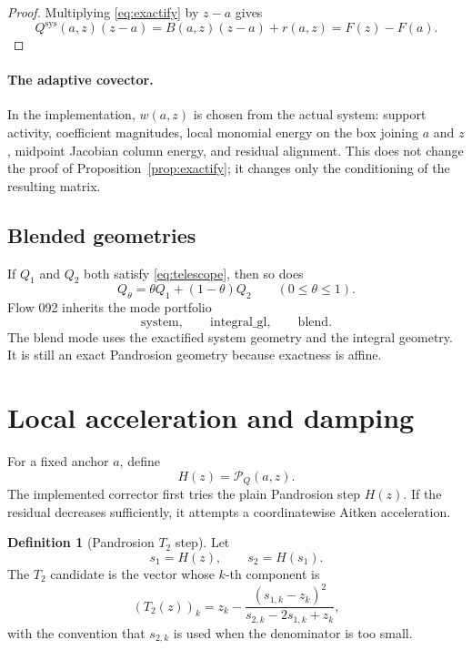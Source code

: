 \documentclass[11pt,a4paper]{article}
\theoremstyle{definition}
\newtheorem{definition}{Definition}[section]
\theoremstyle{plain}
\theoremstyle{remark}
\begin{document}
\begin{proof}
Multiplying \eqref{eq:exactify} by \(z-a\) gives
\[
  Q^{\mathrm{sys}}(a,z)(z-a)
  =
  B(a,z)(z-a)
  +
  r(a,z)
  =
  F(z)-F(a).
\]
\end{proof}

\paragraph{The adaptive covector.}
In the implementation, \(w(a,z)\) is chosen from the actual system:
support activity, coefficient magnitudes, local monomial energy on the box
joining \(a\) and \(z\), midpoint Jacobian column energy, and residual
alignment.  This does not change the proof of Proposition~\ref{prop:exactify};
it changes only the conditioning of the resulting matrix.

\subsection{Blended geometries}

If \(Q_1\) and \(Q_2\) both satisfy \eqref{eq:telescope}, then so does
\[
  Q_\theta=\theta Q_1+(1-\theta)Q_2
  \qquad(0\le \theta\le1).
\]
Flow 092 inherits the mode portfolio
\[
  \mathrm{system},\qquad \mathrm{integral\_gl},\qquad \mathrm{blend}.
\]
The blend mode uses the exactified system geometry and the integral geometry.
It is still an exact Pandrosion geometry because exactness is affine.

\section{Local acceleration and damping}

For a fixed anchor \(a\), define
\[
  H(z)=\mathcal P_Q(a,z).
\]
The implemented corrector first tries the plain Pandrosion step \(H(z)\).  If
the residual decreases sufficiently, it attempts a coordinatewise Aitken
acceleration.

\begin{definition}[Pandrosion \(T_2\) step]
Let
\[
  s_1=H(z),\qquad s_2=H(s_1).
\]
The \(T_2\) candidate is the vector whose \(k\)-th component is
\begin{equation}
  \label{eq:t2}
  (T_2(z))_k
  =
  z_k-\frac{(s_{1,k}-z_k)^2}{s_{2,k}-2s_{1,k}+z_k},
\end{equation}
with the convention that \(s_{2,k}\) is used when the denominator is too small.
\end{definition}
\end{document}
